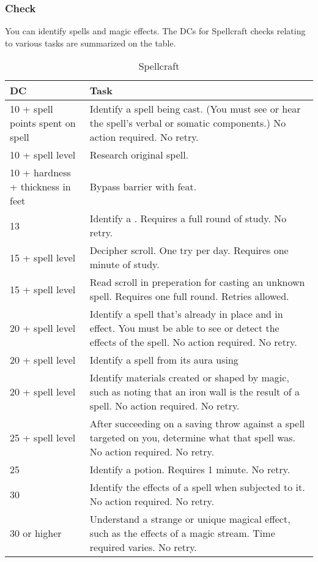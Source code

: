 \subsubsection{Check}
You can identify spells and magic effects. The DCs for Spellcraft checks relating to various tasks are summarized on the  table.
\begin{table*}
\centering
\caption{Spellcraft}
\label{tab:Spellcraft}
\begin{tabular}{|p{}|p{}|}
\hline
\textbf{DC}&\textbf{Task}\\
\hline
10 + spell points spent on spell&Identify a spell being cast. (You must see or hear the spell's verbal or somatic components.) No action required. No retry.\\
10 + spell level&Research original spell.\\
10 + hardness + thickness in feet&Bypass barrier with \nameref{Feat:BurrowingSpell} feat.\\
13 &Identify a \nameref{Spell:GlyphOfWarding}. Requires a full round of study. No retry.\\
15 + spell level&Decipher scroll. One try per day. Requires one minute of study.\\
15 + spell level&Read scroll in preperation for casting an unknown spell. Requires one full round. Retries allowed.\\
20 + spell level&Identify a spell that's already in place and in effect. You must be able to see or detect the effects of the spell. No action required. No retry.\\
20 + spell level&Identify a spell from its aura using \nameref{Spell:DetectMagic}\\
20 + spell level&Identify materials created or shaped by magic, such as noting that an iron wall is the result of a \nameref{Spell:WallOfIron} spell. No action required. No retry.\\
25 + spell level&After succeeding on a saving throw against a spell targeted on you, determine what that spell was. No action required. No retry.\\
25 &Identify a potion. Requires 1 minute. No retry.\\
30 &Identify the effects of a \nameref{Spell:PlanarBinding} spell when subjected to it. No action required. No retry.\\
30 or higher&Understand a strange or unique magical effect, such as the effects of a magic stream. Time required varies. No retry.\\
\hline
\end{tabular}
\normalsize
\end{table*}
